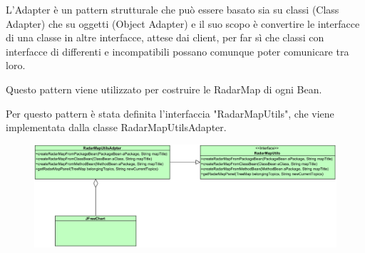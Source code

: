 \documentclass[11pt]{article}
\begin{document}
	L'Adapter è un pattern strutturale che può essere basato sia su classi (Class Adapter) che su oggetti (Object Adapter) e il suo scopo è convertire le interfacce di una classe in altre interfacce, attese dai client, per far sì che classi con interfacce di differenti e incompatibili possano comunque poter comunicare tra loro.
	
	Questo pattern viene utilizzato per costruire le RadarMap di ogni Bean.
	
	Per questo pattern è stata definita l'interfaccia "RadarMapUtils", che viene implementata dalla classe RadarMapUtilsAdapter.
	
	\begin{figure}[!h]
		\includegraphics[width=16.5cm]{diagrams/AdapterPattern}
	\end{figure}
	
\end{document}
